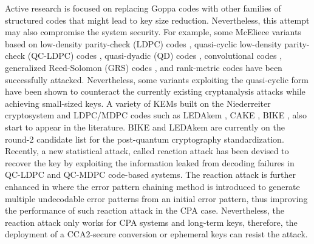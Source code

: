 \documentclass[runningheads]{llncs}
\begin{document}
Active research is focused on replacing Goppa codes with other families of structured codes that might lead to key size reduction. Nevertheless, this attempt may also compromise the system security. For example, some McEliece variants based on low-density parity-check (LDPC) codes \cite{monico2000using}, quasi-cyclic low-density parity-check (QC-LDPC) codes \cite{otmani2010cryptanalysis}, quasi-dyadic (QD) codes \cite{misoczki2009compact}, convolutional codes \cite{londahl2012new}, generalized Reed-Solomon (GRS) codes \cite{baldi2016enhanced}, and rank-metric codes \cite{loidreau2017new,gaborit2018polynomial} have been successfully attacked. Nevertheless, some variants exploiting the quasi-cyclic form  \cite{baldi2013optimization,baldi2008new,misoczki2013mdpc} have been shown to counteract the currently existing cryptanalysis attacks while achieving small-sized keys. A variety of KEMs built on the Niederreiter cryptosystem and LDPC/MDPC codes such as LEDAkem \cite{baldi2018ledakem}, CAKE \cite{barreto2017cake}, BIKE \cite{aragon2017bike}, also start to appear in the literature. BIKE and LEDAkem are currently on the round-2 candidate list for the post-quantum cryptography standardization. Recently, a new statistical attack, called reaction attack \cite{fabvsivc2017reaction,guo2016key} has been devised to recover the key by exploiting the information leaked from decoding failures in QC-LDPC and QC-MDPC code-based systems. The reaction attack is further enhanced in \cite{nilsson2019error} where the error pattern chaining method is introduced to generate multiple undecodable error patterns from an initial error pattern, thus improving the performance of such reaction attack in the CPA case. Nevertheless, the reaction attack only works for CPA systems and long-term keys, therefore, the deployment of a CCA2-secure conversion or ephemeral keys can resist the attack.
\end{document}
